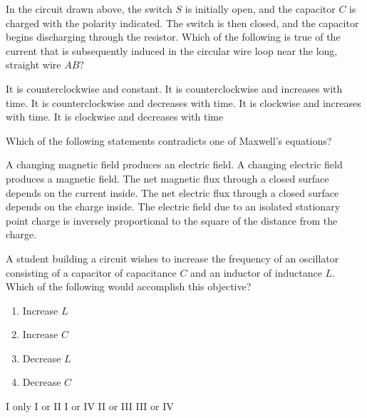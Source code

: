 \documentclass[12pt]{../oss-classkick-exam}
\begin{document}
\begin{questions}
  \question In the circuit drawn above, the switch $S$ is initially open, and
  the capacitor $C$ is charged with the polarity indicated. The switch is then
  closed, and the capacitor begins discharging through the resistor. Which of
  the following is true of the current that is subsequently induced in the
  circular wire loop near the long, straight wire $AB$?

  \begin{choices}
    \choice It is counterclockwise and constant.
    \choice It is counterclockwise and increases with time.
    \choice It is counterclockwise and decreases with time.
    \choice It is clockwise and increases with time.
    \choice It is clockwise and decreases with time
  \end{choices}
  
  \uplevel{\rule{\linewidth}{.5pt}}
  
  \question Which of the following statements contradicts one of Maxwell's
  equations?
  \begin{choices}
    \choice A changing magnetic field produces an electric field.
    \choice A changing electric field produces a magnetic field.
    \choice The net magnetic flux through a closed surface depends on the
    current inside.
    \choice The net electric flux through a closed surface depends on the
    charge inside.
    \choice The electric field due to an isolated stationary point charge is
    inversely proportional to the square of the distance from the charge.
  \end{choices}
  \vspace{.7in}
  
  \uplevel{
    \rule{\linewidth}{.5pt}
  }
  \question A student building a circuit wishes to increase the frequency of an
  oscillator consisting of a capacitor of capacitance $C$ and an inductor of
  inductance $L$. Which of the following would accomplish this objective?
  \begin{enumerate}[nosep,label={\Roman*.}]
  \item Increase $L$
  \item Increase $C$
  \item Decrease $L$
  \item Decrease $C$
  \end{enumerate}
  \vspace{.2in}
  \begin{choices}
    \choice I only
    \choice I or II
    \choice I or IV
    \choice II or III
    \choice III or IV
  \end{choices}
\end{questions}
\end{document}
